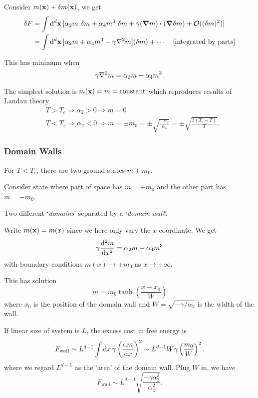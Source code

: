 \documentclass[a4paper,11pt]{article}
\begin{document}
	Consider $m(\vb x) + \delta m(\vb x)$, we get
	\begin{align*}
		\delta F & = \int \dd[d]{\vb x} [\alpha_2 m\ \delta m + \alpha_4 m^3\ \delta m + \gamma (\grad m) \vdot (\grad \delta m) + \mathcal{O}((\delta m)^2)]\\
		& = \int \dd[d]{\vb x} [\alpha_2 m + \alpha_4 m^3 - \gamma \nabla^2 m] (\delta m) + \cdots \quad \text{[integrated by parts]}
	\end{align*} 

	This has minimum when
	\[
		\gamma \laplacian m = \alpha_2 m + \alpha_4 m^3.
	\]
	
	The simplest solution is $m(\vb x) = m = \text{constant}$ which reproduces results of Landau theory
	\begin{align*}
		& T > T_c \Rightarrow \alpha_2 > 0 \Rightarrow m = 0\\
		& T < T_v \Rightarrow \alpha_2 < 0 \Rightarrow m = \pm m_0 = \pm \sqrt{\frac{-\alpha_2}{\alpha_4}} = \pm \sqrt{\frac{3(T_c - T)}{T}}.
	\end{align*}

	\subsubsection{Domain Walls}

	For $T < T_c$, there are two ground states $m \pm m_0$.

	Consider state where part of space has $m = + m_0$ and the other part has $m = - m_0$.

	Two different `\emph{domains}' separated by a `\emph{domain wall}'.


	Write $m(\vb x) = m(x)$ since we here only vary the $x$-coordinate. We get
	\[
		\gamma \dv[2]{m}{x} = \alpha_2 m + \alpha_4 m^3
	\]
	with boundary conditions $m(x)\to \pm m_0$ as $x \to \pm \infty$.
	
	This has solution
	\[
		m = m_0 \tanh(\frac{x - x_0}{W})
	\]
	where $x_0$ is the position of the domain wall and $W = \sqrt{-\gamma/\alpha_2}$ is the width of the wall.
	

	If linear size of system is $L$, the excess cost in free energy is
	\[
		F_{\text{wall}} \sim L ^{d-1} \int \dd{x} \gamma \left( \dv{m}{x} \right)^2 \sim L ^{d-1} W \gamma \left( \frac{m_0}{W} \right)^2.
	\]
	where we regard $L ^{d-1}$ as the `area' of the domain wall. Plug $W$ in, we have
	\[
		F _{\text{wall}} \sim L ^{d-1} \sqrt{\frac{- \gamma \alpha_2^3}{\alpha_4^2}}.
	\]
	
\end{document}
